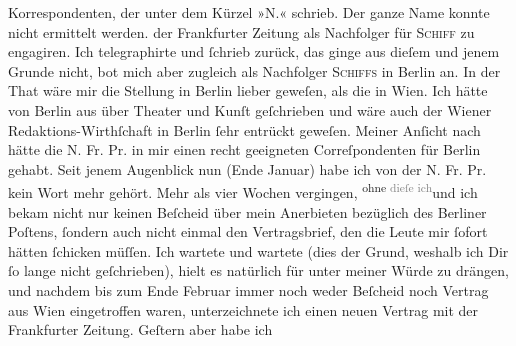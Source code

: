 \begin{ledgroupsized}[t]{13cm}
{{{                  Korrespondenten, der unter dem Kürzel »N.« schrieb. Der ganze Name konnte nicht ermittelt
                  werden.}}}\label{K_L02868-8h} der Frankfurter Zeitung als Nachfolger für \textsc{Schiff} zu engagiren. {\pb}Ich telegraphirte \introOben{}und ſchrieb\introOben{} zurück, das ginge aus dieſem und jenem Grunde
               nicht, bot mich aber zugleich als Nachfolger \textsc{Schiffs} in Berlin an. In der That wäre mir die Stellung in Berlin lieber geweſen,  als die in Wien. Ich hätte von
                  Berlin aus über Theater und Kunſt geſchrieben
               und wäre auch der Wiener Redaktions-Wirthſchaft in
                  Berlin ſehr  entrückt geweſen. Meiner Anſicht nach hätte
               die N. Fr. Pr. in mir einen recht geeigneten
               Correſpondenten für Berlin gehabt. Seit jenem
               Augenblick nun (Ende Januar) habe ich  von der N. Fr.
                  Pr. kein Wort mehr gehört. Mehr als vier Wochen vergingen, \substVorne{}\textsuperscript{ohne{ }\textcolor{gray}{dieſe ich}}{\allowbreak}\substDazwischen{}und ich bekam\substHinten{} nicht nur keinen Beſcheid über mein Anerbieten bezüglich des Berliner Poſtens, ſondern auch nicht einmal den
               Vertragsbrief, den die Leute mir ſofort hätten ſchicken müſſen. Ich wartete und
               wartete (dies der Grund, weshalb ich Dir ſo lange nicht geſchrieben), hielt es
               natürlich für unter {\pb}meiner Würde zu drängen, und
               nachdem bis zum Ende Februar immer noch weder Beſcheid
               noch Vertrag aus Wien eingetroffen waren,
               unterzeichnete ich einen neuen Vertrag mit der Frankfurter Zeitung. Geſtern aber habe ich

\end{ledgroupsized}
